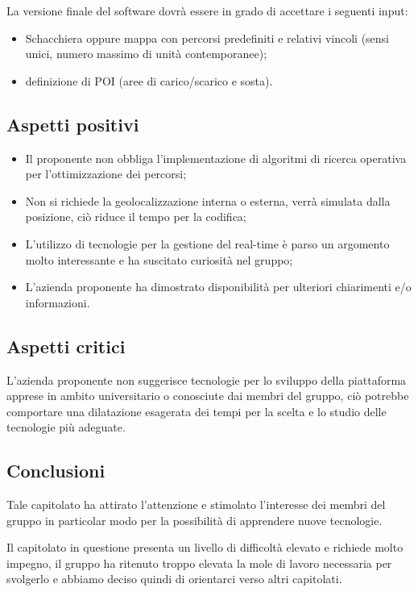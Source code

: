 La versione finale del software dovrà essere in grado di accettare i seguenti input:
\begin{itemize}
\item Schacchiera oppure mappa con percorsi predefiniti e relativi vincoli (sensi unici, numero massimo di unità contemporanee);
\item definizione di POI (aree di carico/scarico e sosta).
\end{itemize}

\subsection{Aspetti positivi}
\begin{itemize}
\item Il proponente non obbliga l'implementazione di algoritmi di ricerca operativa per l'ottimizzazione dei percorsi;
\item Non si richiede la geolocalizzazione interna o esterna, verrà simulata dalla posizione, ciò riduce il tempo per la  codifica;
\item L'utilizzo di tecnologie per la gestione del real-time è parso un argomento molto interessante e ha suscitato curiosità nel gruppo;
\item L'azienda proponente ha dimostrato disponibilità per ulteriori chiarimenti e/o  informazioni.
\end{itemize}

\subsection{Aspetti critici}
L'azienda proponente non suggerisce tecnologie per lo sviluppo della piattaforma apprese in ambito universitario o conosciute dai membri del gruppo, ciò potrebbe comportare una dilatazione esagerata dei tempi per la scelta e lo studio delle tecnologie più adeguate.

\subsection{Conclusioni}
Tale capitolato ha attirato l'attenzione e stimolato l'interesse dei membri del gruppo in particolar modo per la possibilità di apprendere nuove tecnologie.

Il capitolato in questione presenta un livello di difficoltà elevato e richiede molto impegno, il gruppo ha ritenuto troppo elevata la mole di lavoro necessaria per svolgerlo e abbiamo deciso quindi di orientarci verso altri capitolati. 

